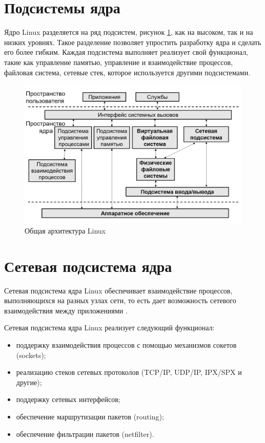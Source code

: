\section{Подсистемы ядра}
Ядро Linux разделяется на ряд подсистем, рисунок \ref{img:arch_linux}, как на высоком, так и на низких уровнях. Такое разделение позволяет упростить разработку ядра и сделать его более гибким.
Каждая подсистема выполняет реализует свой функционал, такие как управление памятью, управление и взаимодействие процессов, файловая система, сетевые стек, которое используется другими подсистемами.  

\begin{figure}[h!]
	\centering
	\includegraphics[height=0.4\textheight]{img/arch_linux} %
	\caption{Общая архитектура Linux}
	\label{img:arch_linux}
\end{figure}

\clearpage

\section{Сетевая подсистема ядра}

Сетевая подсистема ядра Linux \cite{moduls_kernel_linux, linux_network_internals} обеспечивает взаимодействие процессов, выполняющихся на разных узлах сети, то есть дает возможность сетевого взаимодействия между приложениями .

Сетевая подсистема ядра Linux реализует следующий функционал:
\begin{itemize}
	\item поддержку взаимодействия процессов с помощью механизмов сокетов (sockets);
	\item реализацию стеков сетевых протоколов (TCP/IP, UDP/IP, IPX/SPX и другие);
	\item поддержку сетевых интерфейсов;
	\item обеспечение маршрутизации пакетов (routing);
	\item обеспечение фильтрации пакетов (netfilter).
\end{itemize}

